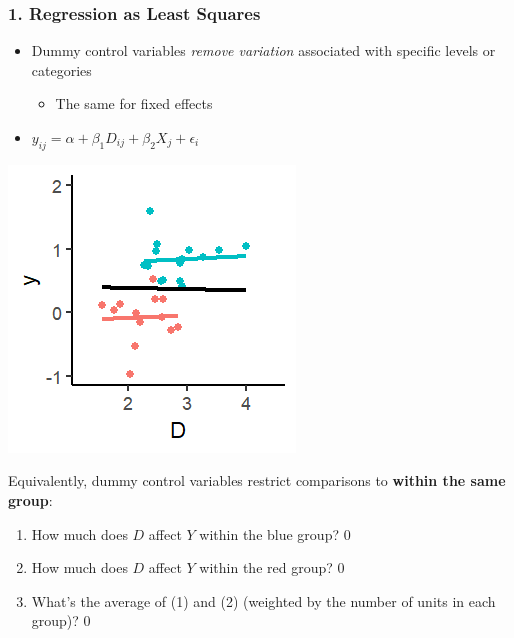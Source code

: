 \documentclass[xcolor=x11names,compress]{beamer}\usepackage[]{graphicx}\usepackage[]{color}
\makeatletter
\def\maxwidth{ %
  \ifdim\Gin@nat@width>\linewidth
    \linewidth
  \else
    \Gin@nat@width
  \fi
}
\newenvironment{knitrout}{}{} %
\renewcommand{\(}{\begin{columns}}
\renewcommand{\)}{\end{columns}}
\newcommand{\<}[1]{\begin{column}{#1}}
\renewcommand{\>}{\end{column}}
\makeatother
\begin{document}
\begin{frame}
\frametitle{1. Regression as Least Squares}
\begin{itemize}
\item Dummy control variables \textit{remove variation} associated with specific levels or categories
\begin{itemize}
\item The same for fixed effects
\end{itemize}
\item $y_{ij} = \alpha + \beta_1 D_{ij} + \beta_2 X_j + \epsilon_i$
\end{itemize}
\begin{multicols}{2}
\begin{knitrout}
\color{fgcolor}
\includegraphics[width=\maxwidth]{figure/graph_ols_FE_last-1} 

\end{knitrout}
\columnbreak
\footnotesize
Equivalently, dummy control variables restrict comparisons to \textbf{within the same group}:
\begin{enumerate}
\item How much does $D$ affect $Y$ within the blue group? 0
\item How much does $D$ affect $Y$ within the red group? 0
\item What's the average of (1) and (2) (weighted by the number of units in each group)? 0
\normalsize
\end{enumerate}
\end{multicols}
\end{frame}
\end{document}
